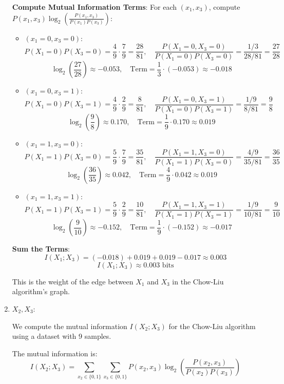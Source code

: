\documentclass[a3paper,12pt]{extarticle} %
\begin{document}
\begin{enumerate}
\textbf{Compute Mutual Information Terms}:
For each \((x_1, x_3)\), compute \(P(x_1, x_3) \log_2 \left( \frac{P(x_1, x_3)}{P(x_1)P(x_3)} \right)\):
\begin{itemize}
    \item \((x_1 = 0, x_3 = 0)\):
    \[
    P(X_1 = 0)P(X_3 = 0) = \frac{4}{9} \cdot \frac{7}{9} = \frac{28}{81}, \quad \frac{P(X_1 = 0, X_3 = 0)}{P(X_1 = 0)P(X_3 = 0)} = \frac{1/3}{28/81} = \frac{27}{28}
    \]
    \[
    \log_2 \left( \frac{27}{28} \right) \approx -0.053, \quad \text{Term} = \frac{1}{3} \cdot (-0.053) \approx -0.018
    \]
    \item \((x_1 = 0, x_3 = 1)\):
    \[
    P(X_1 = 0)P(X_3 = 1) = \frac{4}{9} \cdot \frac{2}{9} = \frac{8}{81}, \quad \frac{P(X_1 = 0, X_3 = 1)}{P(X_1 = 0)P(X_3 = 1)} = \frac{1/9}{8/81} = \frac{9}{8}
    \]
    \[
    \log_2 \left( \frac{9}{8} \right) \approx 0.170, \quad \text{Term} = \frac{1}{9} \cdot 0.170 \approx 0.019
    \]
    \item \((x_1 = 1, x_3 = 0)\):
    \[
    P(X_1 = 1)P(X_3 = 0) = \frac{5}{9} \cdot \frac{7}{9} = \frac{35}{81}, \quad \frac{P(X_1 = 1, X_3 = 0)}{P(X_1 = 1)P(X_3 = 0)} = \frac{4/9}{35/81} = \frac{36}{35}
    \]
    \[
    \log_2 \left( \frac{36}{35} \right) \approx 0.042, \quad \text{Term} = \frac{4}{9} \cdot 0.042 \approx 0.019
    \]
    \item \((x_1 = 1, x_3 = 1)\):
    \[
    P(X_1 = 1)P(X_3 = 1) = \frac{5}{9} \cdot \frac{2}{9} = \frac{10}{81}, \quad \frac{P(X_1 = 1, X_3 = 1)}{P(X_1 = 1)P(X_3 = 1)} = \frac{1/9}{10/81} = \frac{9}{10}
    \]
    \[
    \log_2 \left( \frac{9}{10} \right) \approx -0.152, \quad \text{Term} = \frac{1}{9} \cdot (-0.152) \approx -0.017
    \]
\end{itemize}

\textbf{Sum the Terms}:
\[
I(X_1; X_3) = (-0.018) + 0.019 + 0.019 - 0.017 \approx 0.003
\]
\[
I(X_1; X_3) \approx 0.003 \text{ bits}
\]

This is the weight of the edge between \(X_1\) and \(X_3\) in the Chow-Liu algorithm's graph.
\item \(X_2, X_3\):

We compute the mutual information \(I(X_2; X_3)\) for the Chow-Liu algorithm using a dataset with 9 samples.

The mutual information is:
\[
I(X_2; X_3) = \sum_{x_2 \in \{0,1\}} \sum_{x_3 \in \{0,1\}} P(x_2, x_3) \log_2 \left( \frac{P(x_2, x_3)}{P(x_2)P(x_3)} \right)
\]


\end{enumerate}
\end{document}

